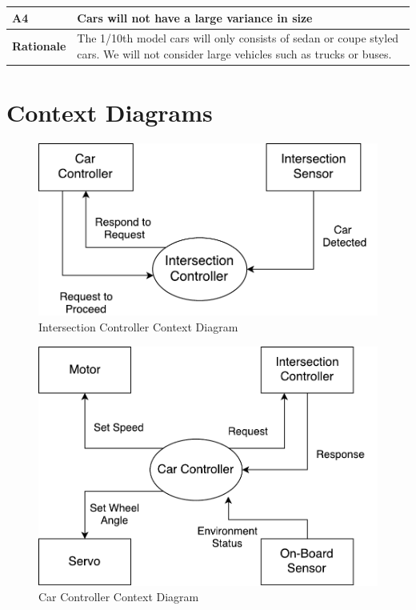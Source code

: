 \documentclass [11pt]{article}
\begin{document}
\begin{longtable}{| p{ } | p{ } | }\hline 
\rowcolor{tableCell}\textbf{A4} & Cars will not have a large variance in size \\ \hline
\textbf{Rationale} &  The 1/10th model cars will only consists of sedan or coupe styled cars. We will not consider large vehicles such as trucks or buses.\\ \hline


\end{longtable}


\section{Context Diagrams}


\begin{figure} [h!]
	\centering
	\includegraphics [scale = 0.8] {figures/IC_ContextDiagram.pdf}
	\caption{Intersection Controller Context Diagram}
\end{figure}
\break
\begin{figure} [h!]
	\centering
	\includegraphics [scale =0.8] {figures/CarCtrl_ContextDiag.pdf}
	\caption{Car Controller Context Diagram}
\end{figure}
\end{document}
